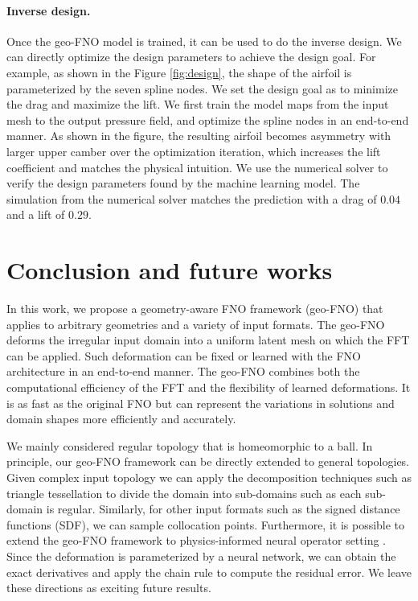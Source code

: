 \documentclass{article}
\begin{document}
\paragraph{Inverse design.} Once the geo-FNO model is trained, it can be used to do the inverse design.  We can directly optimize the design parameters to achieve the design goal. For example, as shown in the Figure \ref{fig:design}, the shape of the airfoil is parameterized by the seven spline nodes. We set the design goal as to minimize the drag and maximize the lift. We first train the model maps from the input mesh to the output pressure field, and optimize the spline nodes in an end-to-end manner. As shown in the figure, the resulting airfoil becomes asymmetry with larger upper camber over the optimization iteration, which increases the lift coefficient and matches the physical intuition. We use the numerical solver to verify the design parameters found by the machine learning model. The simulation from the numerical solver matches the prediction with a drag of $0.04$ and a lift of $0.29$.

\section{Conclusion and future works}
\label{sec:conclusion}

In this work, we propose a geometry-aware FNO framework (geo-FNO) that applies to arbitrary geometries and a variety of input formats.
The geo-FNO deforms the irregular input domain into a uniform latent mesh on which the FFT can be applied. Such deformation can be fixed or learned with the FNO architecture in an end-to-end manner. The geo-FNO combines both the computational efficiency of the FFT  and the flexibility of learned deformations. It is as fast as the original FNO but can represent the variations in solutions and domain shapes more efficiently and accurately.


We mainly considered regular topology that is homeomorphic to a ball. In principle, our geo-FNO framework can be directly extended to general topologies. Given complex input topology we can apply the decomposition techniques such as triangle tessellation to divide the domain into sub-domains such as each sub-domain is regular. Similarly, for other input formats such as the signed distance functions (SDF), we can sample collocation points. Furthermore, it is possible to extend the geo-FNO framework to physics-informed neural operator setting \citep{li2021physics}. Since the deformation is parameterized by a neural network, we can obtain the exact derivatives and apply the chain rule to compute the residual error. We leave these directions as exciting future results.
\end{document}
